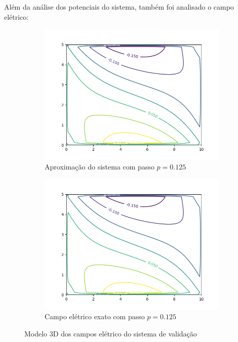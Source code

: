\documentclass[oneside]{abntex2}
\begin{document}
\newpage

Além da análise dos potenciais do sistema, também foi analisado o campo elétrico:

\begin{figure}[h]
  \begin{subfigure}[b]{0.5\textwidth}
    \includegraphics[width=\textwidth]{imgs/cont_aprox_val_elet_1250.png}
    \caption{Aproximação do sistema com passo $p = 0.125$}
    \label{3d_aprox_val_1250}
  \end{subfigure}
  \begin{subfigure}[b]{0.5\textwidth}
    \includegraphics[width=\textwidth]{imgs/cont_grnd_val_elet_1250.png}
    \caption{Campo elétrico exato com passo $p = 0.125$}
    \label{3d_exat_val_1250}
  \end{subfigure}
  \caption{Modelo 3D dos campos elétrico do sistema de validação}
\end{figure}
\end{document}
